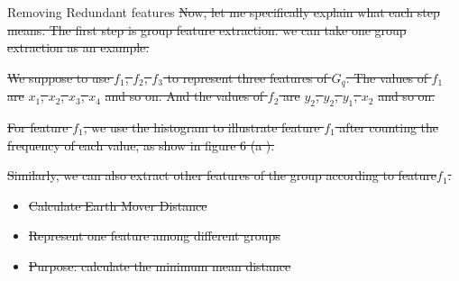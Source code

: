 \documentclass[
 size=14pt,
 paper=smartboard,  %
 mode=present, 		%
 display=slides, 	%
 style=tuliplab,  	%
 pauseslide,
 fleqn,leqno]{powerdot}
\providecommand{\DIFdeltex}[1]{{\protect\color{red}\sout{#1}}}                      %
\providecommand{\DIFdelbegin}{} %
\providecommand{\DIFdelend}{} %
\providecommand{\DIFdel}[1]{\texorpdfstring{\DIFdeltex{#1}}{}} %
\newcommand{\DIFscaledelfig}{0.5}
\newlength{\DIFdelgraphicswidth} %
\newlength{\DIFdelgraphicsheight} %
\newcommand{\DIFdelincludegraphics}[2][]{%
\sbox{\DIFdelgraphicsbox}{\DIFOincludegraphics[#1]{#2}}%
\settoboxwidth{\DIFdelgraphicswidth}{\DIFdelgraphicsbox} %
\settoboxtotalheight{\DIFdelgraphicsheight}{\DIFdelgraphicsbox} %
\scalebox{\DIFscaledelfig}{%
\parbox[b]{\DIFdelgraphicswidth}{\usebox{\DIFdelgraphicsbox}\\[-\baselineskip] \rule{\DIFdelgraphicswidth}{0em}}\llap{\resizebox{\DIFdelgraphicswidth}{\DIFdelgraphicsheight}{%
\setlength{\unitlength}{\DIFdelgraphicswidth}%
\begin{picture}(1,1)%
\thicklines\linethickness{2pt} %
{\color[rgb]{1,0,0}\put(0,0){\framebox(1,1){}}}%
{\color[rgb]{1,0,0}\put(0,0){\line( 1,1){1}}}%
{\color[rgb]{1,0,0}\put(0,1){\line(1,-1){1}}}%
\end{picture}%
}\hspace*{3pt}}} %
} %
\DeclareRobustCommand{\DIFdelbegin}{\DIFOdelbegin \let\includegraphics\DIFdelincludegraphics} %
\DeclareRobustCommand{\DIFdelend}{\DIFOaddend \let\includegraphics\DIFOincludegraphics} %
\begin{document}
\begin{slide}{Removing Redundant features}
\DIFdel{Now, let me specifically explain what each step means.
The first step is group feature extraction.
we can take one group extraction as an example.
  }%

\DIFdel{We suppose to use $f_1$, $f_2$, $f_3$ to represent three features of $G_q$.
The values of $f_1$ are }%
\DIFdel{$x_1$, $x_2$, $x_3$, $x_4$}%
\DIFdel{and so on. And the values of $f_2$ are }%
\DIFdel{$y_2$, $y_2$, $y_1$, $x_2$}%
\DIFdel{and so on.
}%

\DIFdel{For feature $f_1$,
we use the histogram to illustrate feature $f_1$ after
counting the frequency of each value,
as show in figure 6 (a ).
  }%

\DIFdel{Similarly,
we can also extract other features of the group
according to feature$f_1$.
  }%

\DIFdelend \end{slide}
\DIFdelbegin %

\begin{itemize}%
\item%
\DIFdel{Calculate Earth Mover Distance
}%

\item%
\DIFdel{Represent one feature among different groups
}%

\item%
\DIFdel{Purpose: calculate the minimum mean distance
}
\end{itemize}%
\end{document}

